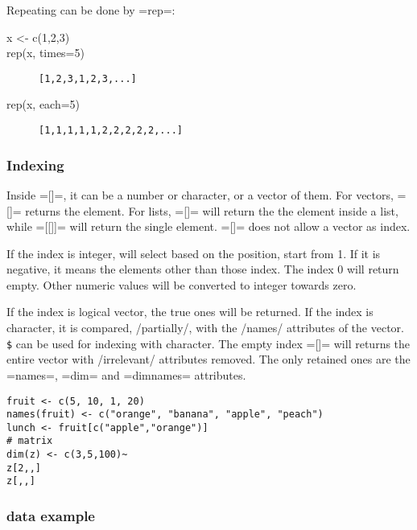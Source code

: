 Repeating can be done by =rep=:
\begin{description}
\item [x <- c(1,2,3)]
\item [rep(x, times=5)] \verb$[1,2,3,1,2,3,...]$
\item [rep(x, each=5)] \verb$[1,1,1,1,1,2,2,2,2,2,...]$
\end{description}
\subsubsection{Indexing}
Inside =[]=, it can be a number or character, or a vector of them.
For vectors, =[]= returns the element.  For lists, =[]= will return
the the element inside a list, while =[[]]= will return the single
element.  =[]= does not allow a vector as index.

If the index is integer, will select based on the position, start from
1.  If it is negative, it means the elements other than those index.
The index 0 will return empty.  Other numeric values will be converted
to integer towards zero.

   If the index is logical vector, the true ones will be returned.
   If the index is character, it is compared, /partially/, with the /names/ attributes of the vector.
   \texttt{\$} can be used for indexing with character.
   The empty index =[]= will returns the entire vector with /irrelevant/ attributes removed.
   The only retained ones are the =names=, =dim= and =dimnames= attributes.
\begin{lstlisting}
fruit <- c(5, 10, 1, 20)
names(fruit) <- c("orange", "banana", "apple", "peach")
lunch <- fruit[c("apple","orange")]
# matrix
dim(z) <- c(3,5,100)~
z[2,,]
z[,,]
\end{lstlisting}

\subsubsection{data example}

